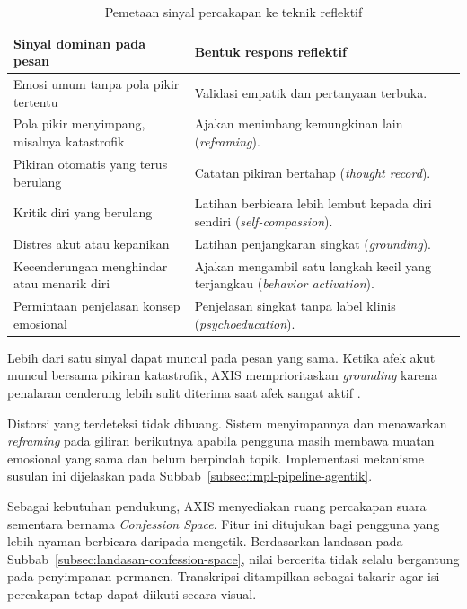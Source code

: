 \begin{table}[!htbp]
\centering
\caption{Pemetaan sinyal percakapan ke teknik reflektif}
\label{tab:pemetaan-teknik-reflektif}
{\footnotesize
\begin{tabularx}{\textwidth}{|>{\raggedright\arraybackslash}p{5.6cm}|>{\raggedright\arraybackslash}X|}
\hline
\rowcolor{tableheadgray}
\textbf{Sinyal dominan pada pesan} & \textbf{Bentuk respons reflektif} \\
\hline
Emosi umum tanpa pola pikir tertentu & Validasi empatik dan pertanyaan terbuka. \\
\hline
Pola pikir menyimpang, misalnya katastrofik & Ajakan menimbang kemungkinan lain (\textit{reframing}). \\
\hline
Pikiran otomatis yang terus berulang & Catatan pikiran bertahap (\textit{thought record}). \\
\hline
Kritik diri yang berulang & Latihan berbicara lebih lembut kepada diri sendiri (\textit{self-compassion}). \\
\hline
Distres akut atau kepanikan & Latihan penjangkaran singkat (\textit{grounding}). \\
\hline
Kecenderungan menghindar atau menarik diri & Ajakan mengambil satu langkah kecil yang terjangkau (\textit{behavior activation}). \\
\hline
Permintaan penjelasan konsep emosional & Penjelasan singkat tanpa label klinis (\textit{psychoeducation}). \\
\hline
\end{tabularx}
}
\end{table}

Lebih dari satu sinyal dapat muncul pada pesan yang sama. Ketika afek akut muncul bersama pikiran katastrofik, AXIS memprioritaskan \textit{grounding} karena penalaran cenderung lebih sulit diterima saat afek sangat aktif \parencite{linehan1993dbt}.

Distorsi yang terdeteksi tidak dibuang. Sistem menyimpannya dan menawarkan \textit{reframing} pada giliran berikutnya apabila pengguna masih membawa muatan emosional yang sama dan belum berpindah topik. Implementasi mekanisme susulan ini dijelaskan pada Subbab~\ref{subsec:impl-pipeline-agentik}.

Sebagai kebutuhan pendukung, AXIS menyediakan ruang percakapan suara sementara bernama \textit{Confession Space}. Fitur ini ditujukan bagi pengguna yang lebih nyaman berbicara daripada mengetik. Berdasarkan landasan pada Subbab~\ref{subsec:landasan-confession-space}, nilai bercerita tidak selalu bergantung pada penyimpanan permanen. Transkripsi ditampilkan sebagai takarir agar isi percakapan tetap dapat diikuti secara visual.

